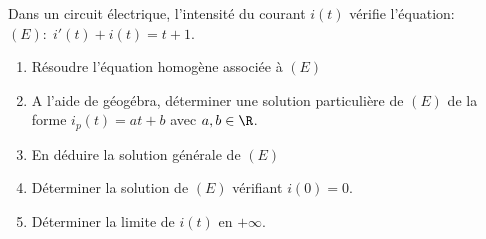 		\begin{exercice_cours}[\quad]{}
			Dans un circuit électrique, l'intensité du courant $i(t)$ vérifie l'équation: $(E):\; i'(t)+i(t)=t+1$.

			\begin{enumerate}
				\item Résoudre l'équation homogène associée à $(E)$
				\item A l'aide de géogébra, déterminer une solution particulière de $(E)$ de la forme $i_p(t)=at+b$ avec $a,b \in \R$.
				\item En déduire la solution générale de $(E)$
				\item Déterminer la solution de $(E)$ vérifiant $i(0)=0$.
				\item Déterminer la limite de $i(t)$ en $+\infty$.
			\end{enumerate}

		\end{exercice_cours}